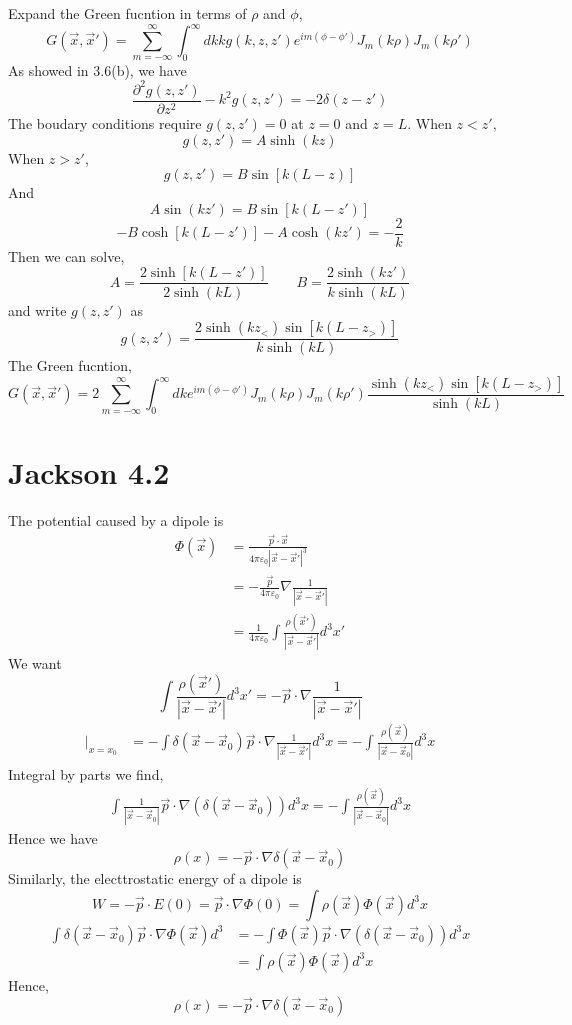 \documentclass{article}
\newcommand{\pd}[2]{\frac{\partial#1}{\partial#2}}
\begin{document}
Expand the Green fucntion in terms of $\rho$ and $\phi$,
\[ G(\vec x,\vec x')=\sum_{m=-\infty}^\infty\int_0^{\infty}dk kg(k,z,z')e^{im(\phi-\phi')}J_m(k\rho)J_m(k\rho') \]
As showed in 3.6(b), we have
\[ \pd{^2g(z,z')}{z^2}-k^2g(z,z')=-2\delta(z-z') \]
The boudary conditions require $g(z,z')=0$ at $z=0$ and $z=L$. When $z<z'$,
\[ g(z,z')=A\sinh(kz) \]
When $z>z'$,
\[ g(z,z')=B\sin[k(L-z)] \]
And
\[ A\sin(kz')=B\sin[k(L-z')] \]
\[ -B\cosh[k(L-z')]-A\cosh(kz')=-\frac{2}{k}\]
Then we can solve,
\[ A=\frac{2\sinh[k(L-z')]}{2\sinh(kL)}\qquad B=\frac{2\sinh(kz')}{k\sinh(kL)}\]
and write $g(z,z')$ as
\[ g(z,z')=\frac{2\sinh(kz_<)\sin[k(L-z_>)]}{k\sinh(kL)} \]
The Green fucntion,
\[ \boxed{G(\vec x,\vec x')=2\sum_{m=-\infty}^\infty\int_0^{\infty}dk e^{im(\phi-\phi')}J_m(k\rho)J_m(k\rho')\frac{\sinh(kz_<)\sin[k(L-z_>)]}{\sinh(kL)}}\]
\pagebreak

\section*{Jackson 4.2}

The potential caused by a dipole is
\begin{align*}
  \Phi(\vec x)&=\frac{\vec p\cdot\vec x}{4\pi\varepsilon_0|\vec x-\vec x'|^3}\\
              &=-\frac{\vec p}{4\pi\varepsilon_0}\nabla\frac{1}{|\vec x-\vec x'|}\\
              &=\frac{1}{4\pi\varepsilon_0}\int\frac{\rho(\vec x')}{|\vec x-\vec x'|}d^3x'
\end{align*}
We want
\[ \int\frac{\rho(\vec x')}{|\vec x-\vec x'|}d^3x'=-\vec p\cdot\nabla\frac{1}{|\vec x-\vec x'|} \]
\begin{align*}
  [-\vec p\cdot\nabla\frac{1}{|\vec x-\vec x'|}]|_{x=x_0}&=-\int\delta(\vec x-\vec x_0)\vec p\cdot\nabla\frac{1}{|\vec x-\vec x'|}d^3x=-\int\frac{\rho(\vec x)}{|\vec x-\vec x_0|}d^3x
\end{align*}
Integral by parts we find,
\begin{align*}
  \int\frac{1}{|\vec x-\vec x_0|}\vec p\cdot\nabla(\delta(\vec x-\vec x_0))d^3x=-\int\frac{\rho(\vec x)}{|\vec x-\vec x_0|}d^3x
\end{align*}
Hence we have
\[ \boxed{\rho(x)=-\vec p\cdot\nabla\delta(\vec x-\vec x_0)}\]
Similarly, the electtrostatic energy of a dipole is
\[ W=-\vec p\cdot E(0)=\vec p\cdot\nabla\Phi(0)=\int\rho(\vec x)\Phi(\vec x)d^3x \]
\begin{align*}
  \int\delta(\vec x-\vec x_0)\vec p\cdot\nabla\Phi(\vec x)d^3&=-\int\Phi(\vec x)\vec p\cdot\nabla(\delta(\vec x-\vec x_0))d^3x\\
                                                             &=\int\rho(\vec x)\Phi(\vec x)d^3x
\end{align*}
Hence,
\[ \boxed{\rho(x)=-\vec p\cdot\nabla\delta(\vec x-\vec x_0)}\]
\pagebreak
\end{document}
